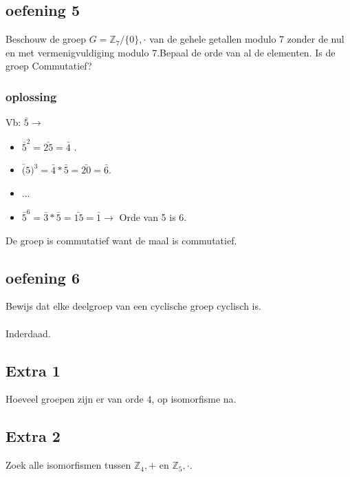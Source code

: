\documentclass[main.tex]{subfiles}
\begin{document}
\subsection*{oefening 5}
Beschouw de groep $G = \mathbb{Z}_{7} /\{0\},\cdot$ van de gehele getallen modulo 7 zonder de nul en met vermenigvuldiging modulo 7.Bepaal de orde van al de elementen. Is de groep Commutatief?
\subsubsection*{oplossing}
Vb: $\bar{5} \rightarrow$
\begin{itemize}
\item $\bar{5}^2=\bar{25}=\bar{4}$ .
\item $\bar(5)^3=\bar{4}*\bar{5}=\bar{20}=\bar{6}$.
\item ...
\item $\bar{5}^6=\bar{3}*\bar{5}=\bar{15}=\bar{1} \rightarrow$ Orde van 5 is 6.
\end{itemize}
De groep is commutatief want de maal is commutatief.

\subsection*{oefening 6}
Bewijs dat elke deelgroep van een cyclische groep cyclisch is.\\\\
Inderdaad.

\subsection*{Extra 1}
Hoeveel groepen zijn er van orde $4$, op isomorfisme na.

\subsection*{Extra 2}
Zoek alle isomorfismen tussen $\mathbb{Z}_{4},+$ en $\mathbb{Z}_{5},\cdot$.
\end{document}
